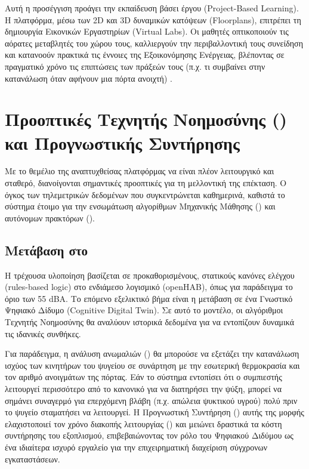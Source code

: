 Αυτή η προσέγγιση προάγει την εκπαίδευση βάσει έργου (Project-Based Learning). Η πλατφόρμα, μέσω των 2D και 3D δυναμικών κατόψεων (Floorplans), επιτρέπει τη δημιουργία Εικονικών Εργαστηρίων (Virtual Labs). Οι μαθητές οπτικοποιούν τις αόρατες μεταβλητές του χώρου τους, καλλιεργούν την περιβαλλοντική τους συνείδηση και κατανοούν πρακτικά τις έννοιες της Εξοικονόμησης Ενέργειας, βλέποντας σε πραγματικό χρόνο τις επιπτώσεις των πράξεών τους (π.χ. τι συμβαίνει στην κατανάλωση όταν αφήνουν μια πόρτα ανοιχτή) \cite{Li2024}.

\section{Προοπτικές Τεχνητής Νοημοσύνης () και Προγνωστικής Συντήρησης}
Με το θεμέλιο της αναπτυχθείσας πλατφόρμας να είναι πλέον λειτουργικό και σταθερό, διανοίγονται σημαντικές προοπτικές για τη μελλοντική της επέκταση. Ο όγκος των τηλεμετρικών δεδομένων που συγκεντρώνεται καθημερινά, καθιστά το σύστημα έτοιμο για την ενσωμάτωση αλγορίθμων Μηχανικής Μάθησης () και αυτόνομων πρακτόρων ().

\subsection{Μετάβαση στο }
Η τρέχουσα υλοποίηση βασίζεται σε προκαθορισμένους, στατικούς κανόνες ελέγχου (rules-based logic) στο ενδιάμεσο λογισμικό (openHAB), όπως για παράδειγμα το όριο των 55 dBA. Το επόμενο εξελικτικό βήμα είναι η μετάβαση σε ένα Γνωστικό Ψηφιακό Δίδυμο (Cognitive Digital Twin). Σε αυτό το μοντέλο, οι αλγόριθμοι Τεχνητής Νοημοσύνης θα αναλύουν ιστορικά δεδομένα για να εντοπίζουν δυναμικά τις ιδανικές συνθήκες.

Για παράδειγμα, η ανάλυση ανωμαλιών () θα μπορούσε να εξετάζει την κατανάλωση ισχύος των κινητήρων του ψυγείου σε συνάρτηση με την εσωτερική θερμοκρασία και τον αριθμό ανοιγμάτων της πόρτας. Εάν το σύστημα εντοπίσει ότι ο συμπιεστής λειτουργεί περισσότερο από το κανονικό για να διατηρήσει την ψύξη, μπορεί να σημάνει συναγερμό για επερχόμενη βλάβη (π.χ. απώλεια ψυκτικού υγρού) πολύ πριν το ψυγείο σταματήσει να λειτουργεί. Η Προγνωστική Συντήρηση () αυτής της μορφής ελαχιστοποιεί τον χρόνο διακοπής λειτουργίας () και μειώνει δραστικά τα κόστη συντήρησης του εξοπλισμού, επιβεβαιώνοντας τον ρόλο του Ψηφιακού Διδύμου ως ένα ιδιαίτερα ισχυρό εργαλείο για την επιχειρηματική διαχείριση σύγχρονων εγκαταστάσεων.

